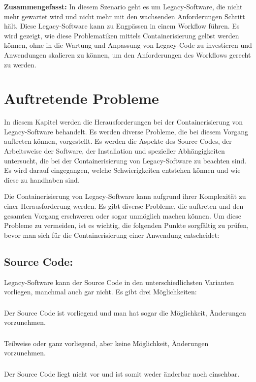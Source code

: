 \textbf{Zusammengefasst:}
In diesem Szenario geht es um Legacy-Software, die nicht mehr gewartet wird und nicht mehr mit den wachsenden Anforderungen Schritt hält. Diese Legacy-Software kann zu Engpässen in einem Workflow führen.
Es wird gezeigt, wie diese Problematiken mittels Containerisierung gelöst werden können, ohne in die Wartung und Anpassung von Legacy-Code zu investieren und Anwendungen skalieren zu können, um den Anforderungen des Workflows gerecht zu werden.
\section{Auftretende Probleme}

In diesem Kapitel werden die Herausforderungen bei der Containerisierung von Legacy-Software behandelt. Es werden diverse Probleme, die bei diesem Vorgang auftreten können, vorgestellt. Es werden die Aspekte des Source Codes, der Arbeitsweise der Software, der Installation und spezieller Abhängigkeiten untersucht, die bei der Containerisierung von Legacy-Software zu beachten sind. Es wird darauf eingegangen, welche Schwierigkeiten entstehen können und wie diese zu handhaben sind.

Die Containerisierung von Legacy-Software kann aufgrund ihrer Komplexität zu einer Herausforderung werden. Es gibt diverse Probleme, die auftreten und den gesamten Vorgang erschweren oder sogar unmöglich machen können. Um diese Probleme zu vermeiden, ist es wichtig, die folgenden Punkte sorgfältig zu prüfen, bevor man sich für die Containerisierung einer Anwendung entscheidet:

\subsection{Source Code:}
Legacy-Software kann der Source Code in den unterschiedlichsten Varianten vorliegen, manchmal auch gar nicht. Es gibt drei Möglichkeiten:
\subsubsection{}
Der Source Code ist vorliegend und man hat sogar die Möglichkeit, Änderungen vorzunehmen.
\subsubsection{}
Teilweise oder ganz vorliegend, aber keine Möglichkeit, Änderungen vorzunehmen.
\subsubsection{}
Der Source Code liegt nicht vor und ist somit weder änderbar noch einsehbar.

